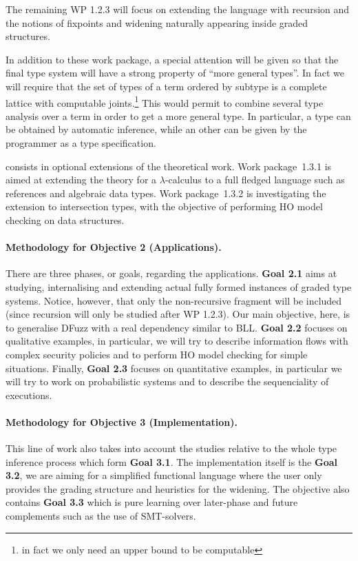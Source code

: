 \documentclass{article}[11pt]
\begin{document}
The remaining WP 1.2.3 will focus on extending the language with recursion and the notions of fixpoints and widening naturally appearing inside graded structures.

In addition to these work package, a special attention will be given so that the final type system will have a strong property of ``more general types''. In fact we will require that the set of types of a term ordered by subtype is a complete lattice with computable joints.\footnote{in fact we only need an upper bound to be computable} This would permit to combine several type analysis over a term in order to get a more general type. In particular, a type can be obtained by automatic inference, while an other can be given by the programmer as a type specification.

 consists in optional extensions of the theoretical work. Work package~1.3.1 is aimed at extending the theory for a $\lambda$-calculus to a full fledged language such as references and algebraic data types. Work package~1.3.2 is investigating the extension to intersection types, with the objective of performing HO model checking on data structures.


\paragraph{Methodology for Objective 2 (Applications).}

There are three phases, or goals, regarding the applications. {\bf Goal 2.1} aims at studying, internalising and extending actual fully formed instances of graded type systems. Notice, however, that only the non-recursive fragment will be included (since recursion will only be studied after WP 1.2.3). Our main objective, here, is to generalise DFuzz with a real dependency similar to BLL. {\bf Goal 2.2} focuses on qualitative examples, in particular, we will try to describe information flows with complex security policies and to perform HO model checking for simple situations. Finally, {\bf Goal 2.3} focuses on quantitative examples, in particular we will try to work on probabilistic systems and to describe the sequenciality of executions.

\paragraph{Methodology for Objective 3 (Implementation).}

This line of work also takes into account the studies relative to the whole type inference process which form {\bf Goal 3.1}. The implementation itself is the {\bf Goal 3.2}, we are aiming for a simplified functional language where the user only provides the grading structure and heuristics for the widening. The objective also contains {\bf Goal 3.3} which is pure learning over later-phase and future complements such as the use of SMT-solvers.
\end{document}
